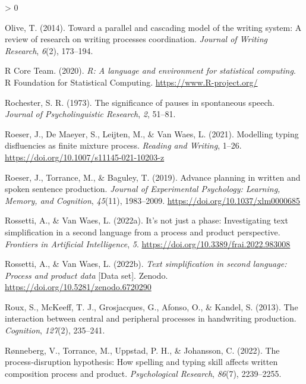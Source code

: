 \documentclass[
  english,
  man,floatsintext]{apa7}
\newlength{\cslhangindent}
\newenvironment{CSLReferences}[2] %
 {%
  \setlength{\parindent}{0pt}
  \ifodd #1 \everypar{\setlength{\hangindent}{\cslhangindent}}\ignorespaces\fi
  \ifnum #2 > 0
  \setlength{\parskip}{#2\baselineskip}
  \fi
 }%
 {}
\begin{document}
\begin{CSLReferences}{1}{0}
\leavevmode\hypertarget{ref-olive2014toward}{}%
Olive, T. (2014). Toward a parallel and cascading model of the writing system: {A} review of research on writing processes coordination. \emph{Journal of Writing Research}, \emph{6}(2), 173--194.

\leavevmode\hypertarget{ref-R-base}{}%
R Core Team. (2020). \emph{R: A language and environment for statistical computing}. R Foundation for Statistical Computing. \url{https://www.R-project.org/}

\leavevmode\hypertarget{ref-rochester1973significance}{}%
Rochester, S. R. (1973). The significance of pauses in spontaneous speech. \emph{Journal of Psycholinguistic Research}, \emph{2}, 51--81.

\leavevmode\hypertarget{ref-roeser2021modelling}{}%
Roeser, J., De Maeyer, S., Leijten, M., \& Van Waes, L. (2021). Modelling typing disfluencies as finite mixture process. \emph{Reading and Writing}, 1--26. \url{https://doi.org/10.1007/s11145-021-10203-z}

\leavevmode\hypertarget{ref-roeser2018advance}{}%
Roeser, J., Torrance, M., \& Baguley, T. (2019). Advance planning in written and spoken sentence production. \emph{Journal of Experimental Psychology: Learning, Memory, and Cognition}, \emph{45}(11), 1983--2009. \url{https://doi.org/10.1037/xlm0000685}

\leavevmode\hypertarget{ref-rossetti2022s}{}%
Rossetti, A., \& Van Waes, L. (2022a). It's not just a phase: Investigating text simplification in a second language from a process and product perspective. \emph{Frontiers in Artificial Intelligence}, \emph{5}. \url{https://doi.org/10.3389/frai.2022.983008}

\leavevmode\hypertarget{ref-rossetti2022text}{}%
Rossetti, A., \& Van Waes, L. (2022b). \emph{Text simplification in second language: Process and product data} {[}Data set{]}. Zenodo. \url{https://doi.org/10.5281/zenodo.6720290}

\leavevmode\hypertarget{ref-roux2013interaction}{}%
Roux, S., McKeeff, T. J., Grosjacques, G., Afonso, O., \& Kandel, S. (2013). The interaction between central and peripheral processes in handwriting production. \emph{Cognition}, \emph{127}(2), 235--241.

\leavevmode\hypertarget{ref-ronneberg2022process}{}%
Rønneberg, V., Torrance, M., Uppstad, P. H., \& Johansson, C. (2022). The process-disruption hypothesis: How spelling and typing skill affects written composition process and product. \emph{Psychological Research}, \emph{86}(7), 2239--2255.


\end{CSLReferences}
\end{document}
